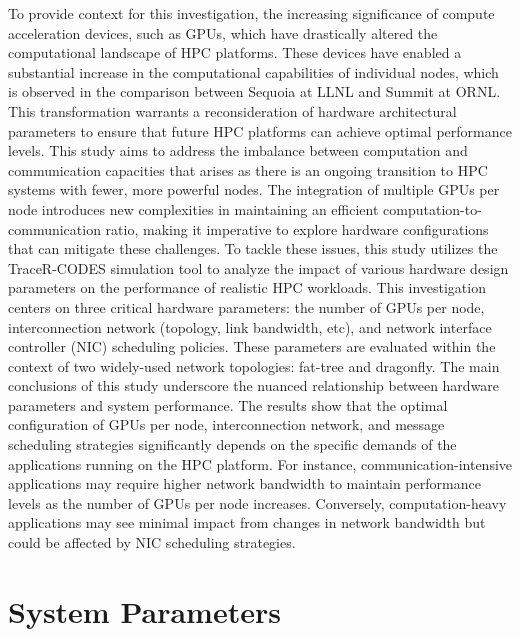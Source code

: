 To provide context for this investigation, the increasing significance of compute acceleration devices, such as GPUs, which have drastically altered the computational landscape of HPC platforms. These devices have enabled a substantial increase in the computational capabilities of individual nodes, which is observed in the comparison between Sequoia at LLNL and Summit at ORNL. This transformation warrants a reconsideration of hardware architectural parameters to ensure that future HPC platforms can achieve optimal performance levels.
This study aims to address the imbalance between computation and communication capacities that arises as there is an ongoing transition to HPC systems with fewer, more powerful nodes. The integration of multiple GPUs per node introduces new complexities in maintaining an efficient computation-to-communication ratio, making it imperative to explore hardware configurations that can mitigate these challenges.
To tackle these issues, this study utilizes the TraceR-CODES simulation tool to analyze the impact of various hardware design parameters on the performance of realistic HPC workloads. This investigation centers on three critical hardware parameters: the number of GPUs per node, interconnection network (topology,
link bandwidth, etc), and network interface controller (NIC) scheduling policies. These parameters are evaluated within the context of two widely-used network topologies: fat-tree and dragonfly.
The main conclusions of this study underscore the nuanced relationship between hardware parameters and system performance. The results show that the optimal configuration of GPUs per node, interconnection network, and message scheduling strategies significantly depends on the specific demands of the applications running on the HPC platform. For instance, communication-intensive applications may require higher network bandwidth to maintain performance levels as the number of GPUs per node increases. Conversely, computation-heavy applications may see minimal impact from changes in network bandwidth but could be affected by NIC scheduling strategies. 



\section{System Parameters}


